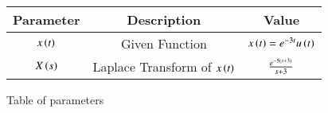 \renewcommand\thetable{1}
\begin{tabular}{|c|c|c|}
    \hline 
    \textbf{Parameter}&\textbf{Description} &\textbf{Value}\\
    \hline
    $x\left(t\right)$ & Given Function & $x\left(t\right) = e^{-3t}u\left(t\right)$ \\
    \hline
	$X\left(s\right)$ & Laplace Transform of $x\left(t\right)$ & $\frac{e^{-5\left(s + 3\right)}}{s + 3}$ \\
    \hline
\end{tabular}

\caption{Table of parameters}
\label{Table:1}

